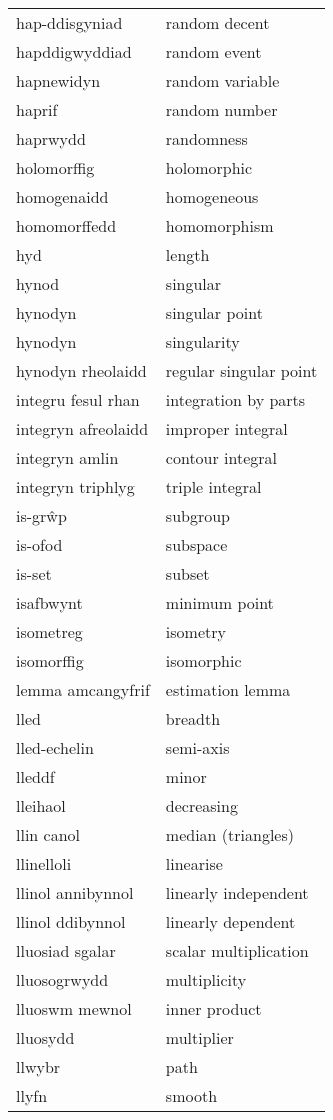 \begin{supertabular}{p{0.22\textwidth}p{0.22\textwidth}}
hap-ddisgyniad & random decent \\
hapddigwyddiad & random event \\
hapnewidyn & random variable \\
haprif & random number \\
haprwydd & randomness \\
holomorffig & holomorphic \\
homogenaidd & homogeneous \\
homomorffedd & homomorphism \\
hyd & length \\
hynod & singular \\
hynodyn & singular point \\
hynodyn & singularity \\
hynodyn rheolaidd & regular singular point \\
integru fesul rhan & integration by parts \\
integryn afreolaidd & improper integral \\
integryn amlin & contour integral \\
integryn triphlyg & triple integral \\
is-grŵp & subgroup \\
is-ofod & subspace \\
is-set & subset \\
isafbwynt & minimum point \\
isometreg & isometry \\
isomorffig & isomorphic \\
lemma amcangyfrif & estimation lemma \\
lled & breadth \\
lled-echelin & semi-axis \\
lleddf & minor \\
lleihaol & decreasing \\
llin canol & median (triangles) \\
llinelloli & linearise \\
llinol annibynnol & linearly independent \\
llinol ddibynnol & linearly dependent \\
lluosiad sgalar & scalar multiplication \\
lluosogrwydd & multiplicity \\
lluoswm mewnol & inner product \\
lluosydd & multiplier \\
llwybr & path \\
llyfn & smooth \\

\end{supertabular}
